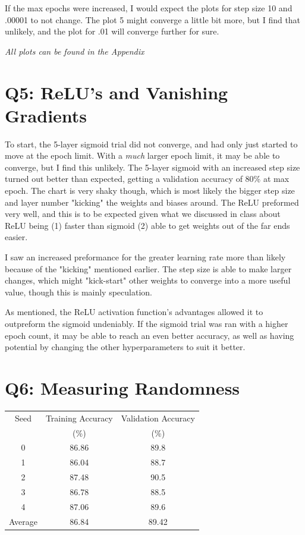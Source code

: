 \documentclass{article}
\begin{document}
        If the max epochs were increased, I would expect the plots for step size 10 and .00001 to not change. 
        The plot 5 might converge a little bit more, but I find that unlikely, 
        and the plot for .01 will converge further for sure.

        \textit{All plots can be found in the Appendix}

    \section*{Q5: ReLU’s and Vanishing Gradients}
        To start, the 5-layer sigmoid trial did not converge, and had only just started to move at the epoch limit. 
        With a \textit{much} larger epoch limit, it may be able to converge, but I find this unlikely.
        The 5-layer sigmoid with an increased step size turned out better than expected, getting a validation accuracy of 80\% at max epoch.
        The chart is very shaky though, which is most likely the bigger step size and layer number "kicking" the weights and biases around.
        The ReLU preformed very well, and this is to be expected given what we discussed in class about ReLU being (1) faster than sigmoid (2) able to get weights out of the far ends easier.

        I saw an increased preformance for the greater learning rate more than likely because of the "kicking" mentioned earlier. 
        The step size is able to make larger changes, which might "kick-start" other weights to converge into a more useful value, 
        though this is mainly speculation.

        As mentioned, the ReLU activation function's advantages allowed it to outpreform the sigmoid undeniably. 
        If the sigmoid trial was ran with a higher epoch count, it may be able to reach an even better accuracy, as well as having potential by changing the other hyperparameters to suit it better.

    \section*{Q6: Measuring Randomness}
        \begin{center}
            \begin{tabular}{|c||c|c|}
                \hline
                Seed & Training Accuracy & Validation Accuracy\\
                 & (\%)& (\%)\\
                \hline
                \hline
                0 & 86.86 & 89.8\\
                \hline
                1 & 86.04 & 88.7\\
                \hline
                2 & 87.48 & 90.5\\
                \hline
                3 & 86.78 & 88.5\\
                \hline
                4 & 87.06 & 89.6\\
                \hline
                Average & 86.84 & 89.42\\
                \hline
            \end{tabular}
        \end{center}
\end{document}
